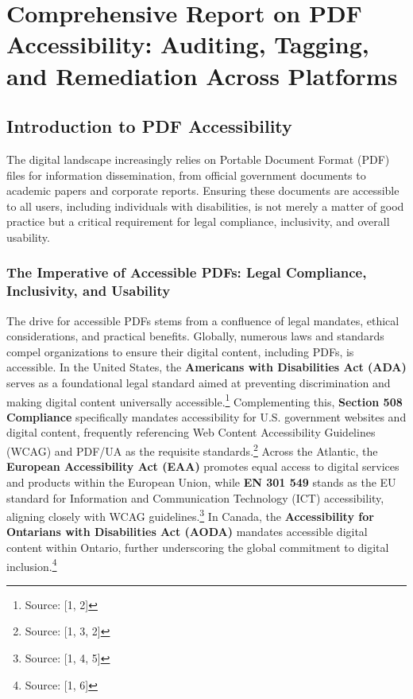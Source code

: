 \chapter{Comprehensive Report on PDF Accessibility: Auditing, Tagging, and Remediation Across Platforms}
\author{} %
\date{} %



\maketitle

\section{Introduction to PDF Accessibility}

The digital landscape increasingly relies on Portable Document Format (PDF) files for information dissemination, from official government documents to academic papers and corporate reports. Ensuring these documents are accessible to all users, including individuals with disabilities, is not merely a matter of good practice but a critical requirement for legal compliance, inclusivity, and overall usability.

\subsection{The Imperative of Accessible PDFs: Legal Compliance, Inclusivity, and Usability}

The drive for accessible PDFs stems from a confluence of legal mandates, ethical considerations, and practical benefits. Globally, numerous laws and standards compel organizations to ensure their digital content, including PDFs, is accessible. In the United States, the \textbf{Americans with Disabilities Act (ADA)} serves as a foundational legal standard aimed at preventing discrimination and making digital content universally accessible.\footnote{Source: [1, 2]} Complementing this, \textbf{Section 508 Compliance} specifically mandates accessibility for U.S. government websites and digital content, frequently referencing Web Content Accessibility Guidelines (WCAG) and PDF/UA as the requisite standards.\footnote{Source: [1, 3, 2]} Across the Atlantic, the \textbf{European Accessibility Act (EAA)} promotes equal access to digital services and products within the European Union, while \textbf{EN 301 549} stands as the EU standard for Information and Communication Technology (ICT) accessibility, aligning closely with WCAG guidelines.\footnote{Source: [1, 4, 5]} In Canada, the \textbf{Accessibility for Ontarians with Disabilities Act (AODA)} mandates accessible digital content within Ontario, further underscoring the global commitment to digital inclusion.\footnote{Source: [1, 6]}

